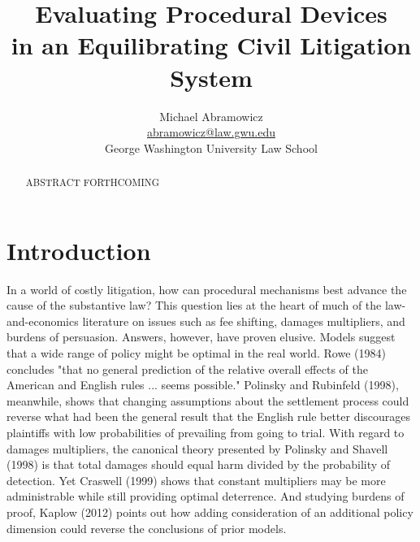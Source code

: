 \documentclass{article}
\newenvironment{nohyphen}
  {\hyphenpenalty=10000 \exhyphenpenalty=10000 \sloppy}
  {\par}
\begin{document}
\title{Evaluating Procedural Devices \\ in an Equilibrating Civil Litigation System}
\author{Michael Abramowicz \\ \href{mailto:abramowicz@law.gwu.edu}{abramowicz@law.gwu.edu} \\ George Washington University Law School}

\maketitle

\begin{abstract}
\begin{nohyphen}
ABSTRACT FORTHCOMING
\end{nohyphen}
\end{abstract}

\section{Introduction}

In a world of costly litigation, how can procedural mechanisms best advance the cause of the substantive law? This question lies at the heart of much of the law-and-economics literature on issues such as fee shifting, damages multipliers, and burdens of persuasion. Answers, however, have proven elusive. Models suggest that a wide range of policy might be optimal in the real world. Rowe (1984) concludes "that no general prediction of the relative overall effects of the American and English rules ... seems possible." Polinsky and Rubinfeld (1998), meanwhile, shows that changing assumptions about the settlement process could reverse what had been the general result that the English rule better discourages plaintiffs with low probabilities of prevailing from going to trial. With regard to damages multipliers, the canonical theory presented by Polinsky and Shavell (1998) is that total damages should equal harm divided by the probability of detection. Yet Craswell  (1999) shows that constant multipliers may be more administrable while still providing optimal deterrence. And studying burdens of proof, Kaplow (2012) points out how adding consideration of an additional policy dimension could reverse the conclusions of prior models. 
\end{document}
